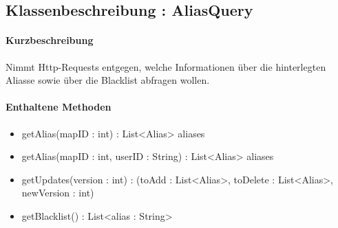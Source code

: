 \subsection{Klassenbeschreibung : AliasQuery}%
\paragraph*{Kurzbeschreibung}
Nimmt Http-Requests entgegen, welche Informationen über die hinterlegten Aliasse sowie über die Blacklist abfragen wollen.
\paragraph*{Enthaltene Methoden}
\begin{itemize}
    \item getAlias(mapID : int) : List<Alias> aliases
    \item getAlias(mapID : int, userID : String) : List<Alias> aliases
    \item getUpdates(version : int) : (toAdd : List<Alias>, toDelete : List<Alias>, newVersion : int)
    \item getBlacklist() : List<alias : String>
\end{itemize}